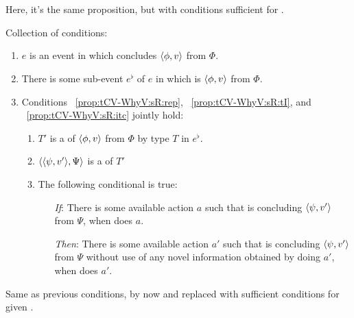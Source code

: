 \section{}
\label{sec:tpyically-concluding}

\begin{note}
  Here, it's the same proposition, but with conditions sufficient for \requ{}.
\end{note}

\begin{note}
  \begin{definition}
    Collection of conditions:
    \begin{enumerate}[label=\arabic*., ref=(\arabic*), series=propRequWhyVSeries]
    \item
      \label{prop:tCV-WhyV:C}
      \(e\) is an event in which \vAgent{} concludes \(\langle \phi, v \rangle\) from \(\Phi\).
    \item
      \label{prop:tCV-WhyV:tCV}
      There is some sub-event \(e^{\flat}\) of \(e\) in which \vAgent{} is \tCV{} \(\langle \phi, v \rangle\) from \(\Phi\).
    \item
      \label{prop:tCV-WhyV:sR}
      Conditions%
      ~\ref{prop:tCV-WhyV:sR:rep},%
      ~\ref{prop:tCV-WhyV:sR:tI}, and%
      ~\ref{prop:tCV-WhyV:sR:itc} %
      jointly hold:
      \begin{enumerate}[label=\alph*., ref=(\alph*)]
      \item
        \label{prop:tCV-WhyV:sR:rep}
        \(T'\) is a \tRep{} of \vAgent{} \tCV{} \(\langle \phi, v \rangle\) from \(\Phi\) by type \(T\) in \(e^{\flat}\).
      \item
        \label{prop:tCV-WhyV:sR:tI}
        \(\langle \langle \psi, v' \rangle, \Psi \rangle\) is a \tI{} of \(T'\)
      \item
        \label{prop:tCV-WhyV:sR:itc}
        The following conditional is true:
        \begin{itemize}
        \item[\emph{If}:]
          There is some available action \(a\) such that \vAgent{} is concluding \(\langle \psi, v' \rangle\) from \(\Psi\), when \vAgent{} does \(a\).
        \item[\emph{Then}:]
          There is some available action \(a'\) such that \vAgent{} is concluding \(\langle \psi, v' \rangle\) from \(\Psi\) without use of any novel information obtained by doing \(a'\), when \vAgent{} does \(a'\).
        \end{itemize}
      \end{enumerate}
    \end{enumerate}
  \end{definition}

  Same as previous conditions, by now \tCV{} and \requ{} replaced with sufficient conditions for \requ{} given \tCV{}.
\end{note}

